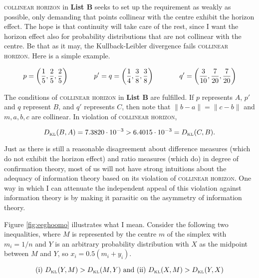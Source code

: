 \documentclass[smallextended]{svjour3}       %
\begin{document}
\textsc{collinear horizon} in \textbf{List B} seeks to set up the requirement
as weakly as possible, only demanding that points collinear with the
centre exhibit the horizon effect. The hope is that continuity will
take care of the rest, since I want the horizon effect also for
probability distributions that are not collinear with the centre. Be
that as it may, the Kullback-Leibler divergence fails
\textsc{collinear horizon}. Here is a simple example.

\begin{equation}
  \label{eq:ubiesohx}
    p=\left(\frac{1}{5},\frac{2}{5},\frac{2}{5}\right) \hspace{.5in}
    p'=q=\left(\frac{1}{4},\frac{3}{8},\frac{3}{8}\right)  \hspace{.5in}
    q'=\left(\frac{3}{10},\frac{7}{20},\frac{7}{20}\right)
\end{equation}

The conditions of \textsc{collinear horizon} in \textbf{List B} are
fulfilled. If $p$ represents $A$, $p'$ and $q$ represent $B$, and $q'$
represents $C$, then note that $\|b-a\|=\|c-b\|$ and $m,a,b,c$ are
collinear. In violation of \textsc{collinear horizon},

\begin{equation}
  \label{eq:eiloothu}
  D_{\mbox{\tiny KL}}(B,A)=7.3820\cdot{}10^{-3}>6.4015\cdot{}10^{-3}=D_{\mbox{\tiny KL}}(C,B).
\end{equation}

Just as there is still a reasonable disagreement about difference
measures (which do not exhibit the horizon effect) and ratio measures
(which do) in degree of confirmation theory, most of us will not have
strong intuitions about the adequacy of information theory based on
its violation of \textsc{collinear horizon}. One way in which I can
attenuate the independent appeal of this violation against information
theory is by making it parasitic on the asymmetry of information
theory.

Figure \ref{fig:eeghoomo} illustrates what I mean. Consider the
following two inequalities, where $M$ is represented by the centre
$m$ of the simplex with $m_{i}=1/n$ and $Y$ is an arbitrary
probability distribution with $X$ as the midpoint between $M$ and $Y$,
so $x_{i}=0.5(m_{i}+y_{i})$.

\begin{equation}
  \label{eq:dailoosu}
  \mbox{(i) }D_{\mbox{\tiny KL}}(Y,M)>D_{\mbox{\tiny KL}}(M,Y)\mbox{ and (ii) }D_{\mbox{\tiny KL}}(X,M)>D_{\mbox{\tiny KL}}(Y,X)
\end{equation}
\end{document}
